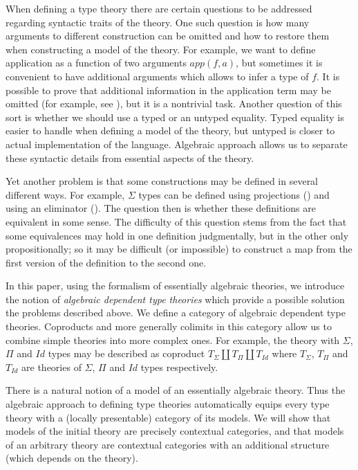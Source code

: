 \documentclass[reqno]{amsart}
\theoremstyle{definition}
\theoremstyle{remark}
\numberwithin{figure}{section}
\begin{document}
When defining a type theory there are certain questions to be addressed regarding syntactic traits of the theory.
One such question is how many arguments to different construction can be omitted and how to restore them when constructing a model of the theory.
For example, we want to define application as a function of two arguments $app(f,a)$, but sometimes it is convenient to have additional arguments which allows to infer a type of $f$.
It is possible to prove that additional information in the application term may be omitted (for example, see \cite{streicher}), but it is a nontrivial task.
Another question of this sort is whether we should use a typed or an untyped equality.
Typed equality is easier to handle when defining a model of the theory, but untyped is closer to actual implementation of the language.
Algebraic approach allows us to separate these syntactic details from essential aspects of the theory.

Yet another problem is that some constructions may be defined in several different ways.
For example, $\Sigma$ types can be defined using projections () and using an eliminator ().
The question then is whether these definitions are equivalent in some sense.
The difficulty of this question stems from the fact that some equivalences may hold in one definition judgmentally, but in the other only propositionally;
so it may be difficult (or impossible) to construct a map from the first version of the definition to the second one.

In this paper, using the formalism of essentially algebraic theories, we introduce the notion of
\emph{algebraic dependent type theories} which provide a possible solution the problems described above.
We define a category of algebraic dependent type theories.
Coproducts and more generally colimits in this category allow us to combine simple theories into more complex ones.
For example, the theory with $\Sigma$, $\Pi$ and $Id$ types may be described as coproduct $T_\Sigma \amalg T_\Pi \amalg T_{Id}$
where $T_\Sigma$, $T_\Pi$ and $T_{Id}$ are theories of $\Sigma$, $\Pi$ and $Id$ types respectively.

There is a natural notion of a model of an essentially algebraic theory.
Thus the algebraic approach to defining type theories automatically equips every type theory with a (locally presentable) category of its models.
We will show that models of the initial theory are precisely contextual categories,
and that models of an arbitrary theory are contextual categories with an additional structure (which depends on the theory).
\end{document}
